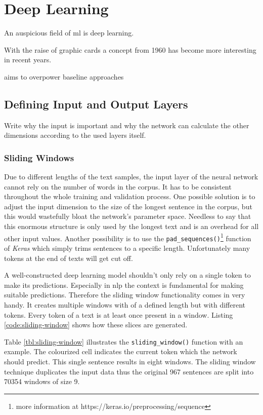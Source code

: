 \chapter{Deep Learning}

An auspicious field of \acrlong{ml} is deep learning.

With the raise of graphic cards a concept from 1960 has become more interesting in recent years.

aims to overpower baseline approaches

\section{Defining Input and Output Layers}

Write why the input is important and why the network can calculate the other dimensions according to the used layers itself.

\subsection{Sliding Windows}
\label{chap:sliding-window}

Due to different lengths of the text samples, the input layer of the neural network cannot rely on the number of words in the corpus. It has to be consistent
throughout the whole training and validation process. One possible solution is to adjust the input dimension to the size of the longest sentence in the corpus,
but this would wastefully bloat the network's parameter space. Needless to say that this enormous structure is only used by the longest text and is an overhead
for all other input values. Another possibility is to use the \verb|pad_sequences()|\footnote{more information at https://keras.io/preprocessing/sequence} function
of \emph{Keras} which simply trims sentences to a specific length. Unfortunately many tokens at the end of texts will get cut off.

A well-constructed deep learning model shouldn't only rely on a single token to make its predictions. Especially in \acrshort{nlp} the context is fundamental for
making suitable predictions. Therefore the sliding window functionality comes in very handy. It creates multiple windows with of a defined length but with different
tokens. Every token of a text is at least once present in a window. Listing \ref{code:sliding-window} shows how these slices are generated.

Table \ref{tbl:sliding-window} illustrates the \verb|sliding_window()| function with an example. The colourized cell indicates the current token which the network
should predict. This single sentence results in eight windows. The sliding window technique duplicates the input data thus the original 967 sentences are split into
70354 windows of size 9.

